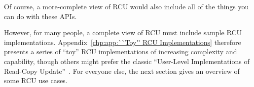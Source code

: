 Of course, a more-complete view of RCU would also include
all of the things you can do with these APIs.

However, for many people, a complete view of RCU must include sample
RCU implementations.
Appendix~\ref{chp:app:``Toy'' RCU Implementations} therefore presents a series
of ``toy'' RCU implementations of increasing complexity and capability,
though others might prefer the classic
``User-Level Implementations of Read-Copy
Update''~\cite{MathieuDesnoyers2012URCU}.
For everyone else, the next section gives an overview of some RCU use cases.
\fi
